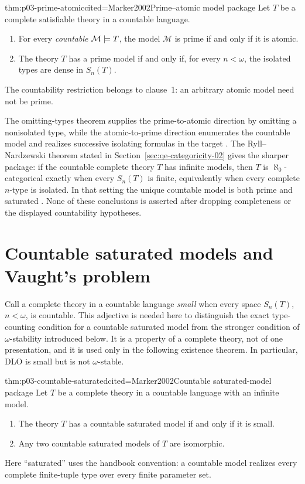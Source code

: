 \begin{hbtheorem}{thm:p03-prime-atomic}{cited=Marker2002}{Prime--atomic model package}
Let \(T\) be a complete satisfiable theory in a countable language.
\begin{enumerate}
  \item For every \emph{countable} \(\mathcal M\models T\), the model
        \(\mathcal M\) is prime if and only if it is atomic.
  \item The theory \(T\) has a prime model if and only if, for every
        \(n<\omega\), the isolated types are dense in \(S_n(T)\).
\end{enumerate}
The countability restriction belongs to clause~1: an arbitrary atomic model
need not be prime.
\end{hbtheorem}

The omitting-types theorem supplies the prime-to-atomic direction by omitting
a nonisolated type, while the atomic-to-prime direction enumerates the
countable model and realizes successive isolating formulas in the target
\cite{Marker2002}.  The Ryll--Nardzewski theorem stated in
Section~\ref{sec:qe-categoricity-02} gives the sharper package: if the
countable complete theory \(T\) has infinite
models, then \(T\) is \(\aleph_0\)-categorical exactly when every
\(S_n(T)\) is finite, equivalently when every complete \(n\)-type is isolated.
In that setting the unique countable model is both prime and saturated
\cite{RyllNardzewski1959,Engeler1959,Svenonius1959}.  None of these conclusions
is asserted after dropping completeness or the displayed countability
hypotheses.

\section{Countable saturated models and Vaught's problem}
\label{sec:p03-countable-models}

Call a complete theory in a countable language \emph{small} when every
space \(S_n(T)\), \(n<\omega\), is countable.  This adjective is needed here
to distinguish the exact type-counting condition for a countable saturated
model from the stronger condition of \(\omega\)-stability introduced below.
It is a property of a complete theory, not of one presentation, and it is used
only in the following existence theorem.  In particular, DLO is small but is
not \(\omega\)-stable.

\begin{hbtheorem}{thm:p03-countable-saturated}{cited=Marker2002}{Countable saturated-model package}
Let \(T\) be a complete theory in a countable language with an infinite
model.
\begin{enumerate}
  \item The theory \(T\) has a countable saturated model if and only if it is
        small.
  \item Any two countable saturated models of \(T\) are isomorphic.
\end{enumerate}
Here ``saturated'' uses the handbook convention: a countable model realizes
every complete finite-tuple type over every finite parameter set.
\end{hbtheorem}

